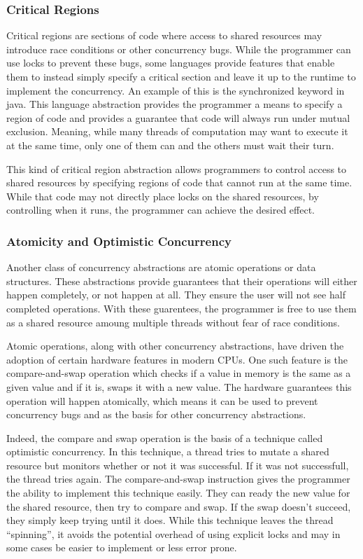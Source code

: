 \documentclass{article}
\begin{document}
\subsubsection{Critical Regions}
Critical regions are sections of code where access to shared resources may
introduce race conditions or other concurrency bugs. While the programmer can
use locks to prevent these bugs, some languages provide features that enable
them to instead simply specify a critical section and leave it up to the runtime
to implement the concurrency. An example of this is the synchronized keyword in
java. This language abstraction provides the programmer a means to specify a
region of code and provides a guarantee that code will always run under mutual
exclusion. Meaning, while many threads of computation may want to execute it at
the same time, only one of them can and the others must wait their turn.
\cite{Coursera}

This kind of critical region abstraction allows programmers to control access to
shared resources by specifying regions of code that cannot run at the same time.
While that code may not directly place locks on the shared resources, by
controlling when it runs, the programmer can achieve the desired effect.
\cite{Coursera}

\subsubsection{Atomicity and Optimistic Concurrency}
Another class of concurrency abstractions are atomic operations or data
structures. These abstractions provide guarantees that their operations will
either happen completely, or not happen at all. They ensure the user will not
see half completed operations. With these guarentees, the programmer is free to
use them as a shared resource amoung multiple threads without fear of race
conditions.
\cite{Coursera}

Atomic operations, along with other concurrency abstractions, have driven the
adoption of certain hardware features in modern CPUs. One such feature is the
compare-and-swap operation which checks if a value in memory is the same as a
given value and if it is, swaps it with a new value. The hardware guarantees
this operation will happen atomically, which means it can be used to prevent
concurrency bugs and as the basis for other concurrency abstractions.
\cite{Coursera}

Indeed, the compare and swap operation is the basis of a technique called
optimistic concurrency. In this technique, a thread tries to mutate a shared
resource but monitors whether or not it was successful. If it was not
successfull, the thread tries again. The compare-and-swap instruction gives the
programmer the ability to implement this technique easily. They can ready the
new value for the shared resource, then try to compare and swap. If the swap
doesn't succeed, they simply keep trying until it does. While this technique
leaves the thread ``spinning'', it avoids the potential overhead of using explicit
locks and may in some cases be easier to implement or less error prone.
\cite{Coursera}
\end{document}
